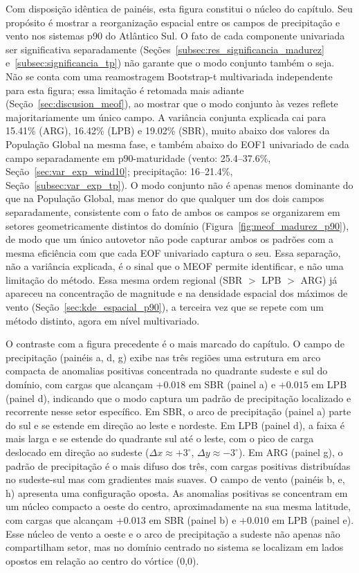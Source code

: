 Com disposição idêntica de painéis, esta figura constitui o núcleo do capítulo. Seu propósito é mostrar a reorganização espacial entre os campos de precipitação e vento nos sistemas p90 do Atlântico Sul. O fato de cada componente univariada ser significativa separadamente (Seções~\ref{subsec:res_significancia_madurez} e~\ref{subsec:significancia_tp}) não garante que o modo conjunto também o seja. Não se conta com uma reamostragem Bootstrap-t multivariada independente para esta figura; essa limitação é retomada mais adiante (Seção~\ref{sec:discusion_meof}), ao mostrar que o modo conjunto às vezes reflete majoritariamente um único campo.
A variância conjunta explicada cai para 15.41\% (ARG), 16.42\% (LPB) e 19.02\% (SBR), muito abaixo dos valores da População Global na mesma fase, e também abaixo do EOF1 univariado de cada campo separadamente em p90-maturidade (vento: 25.4--37.6\%, Seção~\ref{sec:var_exp_wind10}; precipitação: 16--21.4\%, Seção~\ref{subsec:var_exp_tp}). O modo conjunto não é apenas menos dominante do que na População Global, mas menor do que qualquer um dos dois campos separadamente, consistente com o fato de ambos os campos se organizarem em setores geometricamente distintos do domínio (Figura~\ref{fig:meof_madurez_p90}), de modo que um único autovetor não pode capturar ambos os padrões com a mesma eficiência com que cada EOF univariado captura o seu. Essa separação, não a variância explicada, é o sinal que o MEOF permite identificar, e não uma limitação do método. Essa mesma ordem regional (SBR $>$ LPB $>$ ARG) já apareceu na concentração de magnitude e na densidade espacial dos máximos de vento (Seção~\ref{sec:kde_espacial_p90}), a terceira vez que se repete com um método distinto, agora em nível multivariado.

O contraste com a figura precedente é o mais marcado do capítulo.
O campo de precipitação (painéis a, d, g) exibe nas três regiões uma estrutura em arco compacta de anomalias positivas concentrada no quadrante sudeste e sul do domínio, com cargas que alcançam $+0.018$ em SBR (painel a) e $+0.015$ em LPB (painel d), indicando que o modo captura um padrão de precipitação localizado e recorrente nesse setor específico. Em SBR, o arco de precipitação (painel a) parte do sul e se estende em direção ao leste e nordeste.
Em LPB (painel d), a faixa é mais larga e se estende do quadrante sul até o leste, com o pico de carga deslocado em direção ao sudeste ($\Delta x \approx +3^{\circ}$, $\Delta y \approx -3^{\circ}$). Em ARG (painel g), o padrão de precipitação é o mais difuso dos três, com cargas positivas distribuídas no sudeste-sul mas com gradientes mais suaves.
O campo de vento (painéis b, e, h) apresenta uma configuração oposta. As anomalias positivas se concentram em um núcleo compacto a oeste do centro, aproximadamente na sua mesma latitude, com cargas que alcançam $+0.013$ em SBR (painel b) e $+0.010$ em LPB (painel e).
Esse núcleo de vento a oeste e o arco de precipitação a sudeste não apenas não compartilham setor, mas no domínio centrado no sistema se localizam em lados opostos em relação ao centro do vórtice (0,0).

